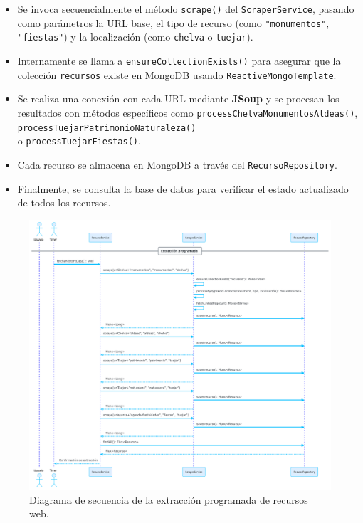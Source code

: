 \begin{itemize}
  \item Se invoca secuencialmente el método \texttt{scrape()} del \texttt{ScraperService}, pasando como parámetros la URL base, el tipo de recurso (como \texttt{"monumentos"}, \texttt{"fiestas"}) y la localización (como \texttt{chelva} o \texttt{tuejar}).
  \item Internamente se llama a \texttt{ensureCollectionExists()} para asegurar que la colección \texttt{recursos} existe en MongoDB usando \texttt{ReactiveMongoTemplate}.
  \item Se realiza una conexión con cada URL mediante \textbf{JSoup} y se procesan los resultados con métodos específicos como \texttt{processChelvaMonumentosAldeas()},\\ \texttt{processTuejarPatrimonioNaturaleza()}\\ o \texttt{processTuejarFiestas()}.
  \item Cada recurso se almacena en MongoDB a través del \texttt{RecursoRepository}.
  \item Finalmente, se consulta la base de datos para verificar el estado actualizado de todos los recursos.
\end{itemize}

\begin{figure}[h!tb]
    \centering
    \includegraphics[width=1\textwidth]{figs/secuencia_recursos_schedule.pdf}
    \caption{Diagrama de secuencia de la extracción programada de recursos web.\label{fig:secuencia_recursos_scheduled}}
\end{figure}

